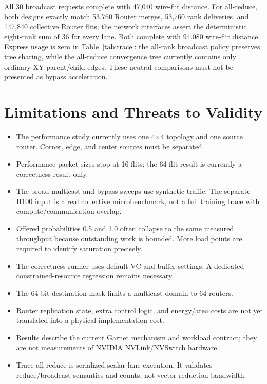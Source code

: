 \documentclass[10pt]{article}
\begin{document}
All 30 broadcast requests complete with 47,040 wire-flit distance.  For
all-reduce, both designs exactly match 53,760 Router merges, 53,760 rank
deliveries, and 147,840 collective Router flits; the network interfaces assert
the deterministic eight-rank sum of 36 for every lane.  Both complete with
94,080 wire-flit distance.  Express usage is zero in Table~\ref{tab:trace}:
the all-rank broadcast policy preserves tree sharing, while the all-reduce
convergence tree currently contains only ordinary XY parent/child edges.
These neutral comparisons must not be presented as bypass acceleration.

\section{Limitations and Threats to Validity}

\begin{itemize}
  \item The performance study currently uses one 4$\times$4 topology and one
        source router.  Corner, edge, and center sources must be separated.
  \item Performance packet sizes stop at 16 flits; the 64-flit result is
        currently a correctness result only.
  \item The broad multicast and bypass sweeps use synthetic traffic.  The
        separate H100 input is a real collective microbenchmark, not a full
        training trace with compute/communication overlap.
  \item Offered probabilities 0.5 and 1.0 often collapse to the same measured
        throughput because outstanding work is bounded.  More load points are
        required to identify saturation precisely.
  \item The correctness runner uses default VC and buffer settings.  A
        dedicated constrained-resource regression remains necessary.
  \item The 64-bit destination mask limits a multicast domain to 64 routers.
  \item Router replication state, extra control logic, and energy/area costs
        are not yet translated into a physical implementation cost.
  \item Results describe the current Garnet mechanism and workload contract;
        they are not measurements of NVIDIA NVLink/NVSwitch hardware.
  \item Trace all-reduce is serialized scalar-lane execution.  It validates
        reduce/broadcast semantics and counts, not vector reduction bandwidth.
\end{itemize}
\end{document}
